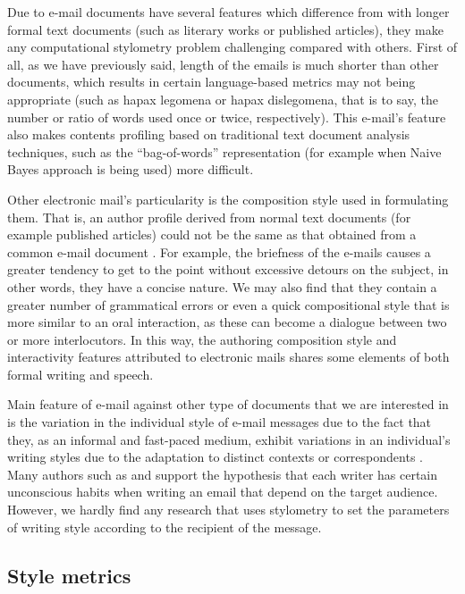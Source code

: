 Due to e-mail documents have several features which difference from with longer formal text documents (such as literary works or published articles), they make any computational stylometry problem challenging compared with others. First of all, as we have previously said, length of the emails is much shorter than other documents, which results in certain language-based metrics may not being appropriate (such as hapax legomena or hapax dislegomena, that is to say, the number or ratio of words used once or twice, respectively). This e-mail's feature also makes contents profiling based on traditional text document analysis techniques, such as the ``bag-of-words'' representation (for example when Naive Bayes approach is being used) more difficult.

Other electronic mail's particularity is the composition style used in formulating them. That is, an author profile derived from normal text documents (for example published articles) could not be the same as that obtained from a common e-mail document \citep{de2001mining}. For example, the briefness of the e-mails causes a greater tendency to get to the point without excessive detours on the subject, in other words, they have a concise nature. We may also find that they contain a greater number of grammatical errors or even a quick compositional style that is more similar to an oral interaction, as these can become a dialogue between two or more interlocutors. In this way, the authoring composition style and interactivity features attributed to electronic mails shares some elements of both formal writing and speech.

Main feature of e-mail against other type of documents that we are interested in is the variation in the individual style of e-mail messages due to the fact that they, as an informal and fast-paced medium, exhibit variations in an individual's writing styles due to the adaptation to distinct contexts or correspondents \citep{argamon2003style}. Many authors such as \cite{allen1974methods} and \cite{de2001mining} support the hypothesis that each writer has certain unconscious habits when writing an email that depend on the target audience. However, we hardly find any research that uses stylometry to set the parameters of writing style according to the recipient of the message.

\subsection{Style metrics}\label{ssect:stymet}
